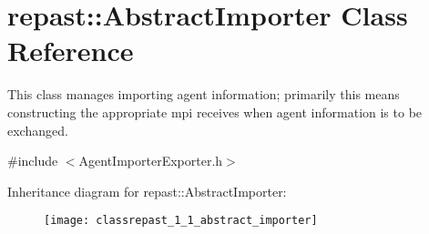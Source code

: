 \hypertarget{classrepast_1_1_abstract_importer}{\section{repast\-:\-:Abstract\-Importer Class Reference}
\label{classrepast_1_1_abstract_importer}
}


This class manages importing agent information; primarily this means constructing the appropriate mpi receives when agent information is to be exchanged.  




{\ttfamily \#include $<$Agent\-Importer\-Exporter.\-h$>$}

Inheritance diagram for repast\-:\-:Abstract\-Importer\-:\begin{figure}[H]
\begin{center}
\leavevmode
\texttt{[image: classrepast\_1\_1\_abstract\_importer]}
\end{center}
\end{figure}
